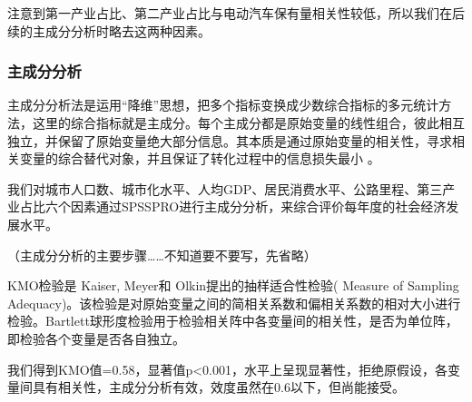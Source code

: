 \documentclass[]{article}
\begin{document}

注意到第一产业占比、第二产业占比与电动汽车保有量相关性较低，所以我们在后续的主成分分析时略去这两种因素。

\subsubsection{{主成分分析}}

主成分分析法是运用``降维''思想，把多个指标变换成少数综合指标的多元统计方法，这里的综合指标就是主成分。每个主成分都是原始变量的线性组合，彼此相互独立，并保留了原始变量绝大部分信息。其本质是通过原始变量的相关性，寻求相关变量的综合替代对象，并且保证了转化过程中的信息损失最小
。

我们对城市人口数、城市化水平、人均GDP、居民消费水平、公路里程、第三产业占比六个因素通过SPSSPRO进行主成分分析，来综合评价每年度的社会经济发展水平。

（主成分分析的主要步骤\ldots\ldots 不知道要不要写，先省略）

KMO检验是 Kaiser, Meyer和 Olkin提出的抽样适合性检验( Measure of Sampling
Adequacy)。该检验是对原始变量之间的简相关系数和偏相关系数的相对大小进行检验。Bartlett球形度检验用于检验相关阵中各变量间的相关性，是否为单位阵，即检验各个变量是否各自独立。

我们得到KMO值=0.58，显著值p\textless0.001，水平上呈现显著性，拒绝原假设，各变量间具有相关性，主成分分析有效，效度虽然在0.6以下，但尚能接受。



\begin{table}[h]
  \centering
  \caption{总方差解释}
  \label{tab:总方差解释}
\end{table}
\end{document}
